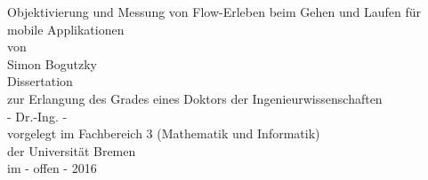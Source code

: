 \begin{titlepage}
\begin{singlespace}
\begin{center}
\Huge Objektivierung und Messung von Flow-Erleben beim Gehen und Laufen für mobile Applikationen\\
\vspace{15mm}
\normalsize von\\
\normalsize Simon Bogutzky\\
\vspace{30mm}
\normalsize Dissertation\\
\normalsize zur Erlangung des Grades eines Doktors der Ingenieurwissenschaften\\
\normalsize - Dr.-Ing. -\\
\vspace{80mm}
\normalsize vorgelegt im Fachbereich 3 (Mathematik und Informatik)\\
\normalsize der Universität Bremen\\
\normalsize im - offen - 2016\\
\end{center}
\end{singlespace}
\end{titlepage}